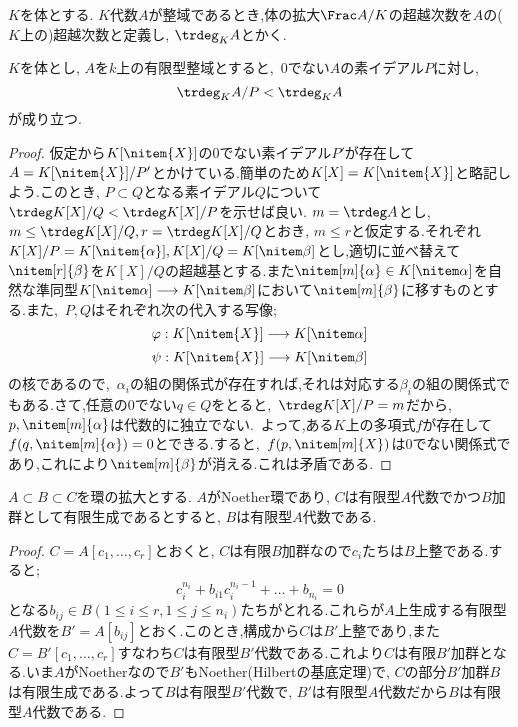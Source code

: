 \begin{defi}
	$K$を体とする. $K$代数$A$が整域であるとき,体の拡大$\Frac A/K$の超越次数を$A$の($K$上の)超越次数と定義し, $\trdeg_K A$とかく.
\end{defi}

\begin{prop}\label{prop:weeknullstellensatzの補題}
	$K$を体とし, $A$を$k$上の有限型整域とすると,~0でない$A$の素イデアル$P$に対し,
	\[\trdeg_K A/P<\trdeg_K A\]
	が成り立つ.
\end{prop}

\begin{proof}
	仮定から$K[\nitem{X}]$の0でない素イデアル$P'$が存在して$A=K[\nitem{X}]/P'$とかけている.簡単のため$K[X]=K[\nitem{X}]$と略記しよう.このとき, $P\subset Q$となる素イデアル$Q$について$\trdeg K[X]/Q<\trdeg K[X]/P$を示せば良い. $m=\trdeg A$とし,~$m\leq\trdeg K[X]/Q,r=\trdeg K[X]/Q$とおき, $m\leq r$と仮定する.それぞれ$K[X]/P=K[\nitem{\alpha}],K[X]/Q=K[\nitem\beta]$とし,適切に並べ替えて$\nitem[r]{\beta}$を$K[X]/Q$の超越基とする.また$\nitem[m]{\alpha}\in K[\nitem\alpha]$を自然な準同型$K[\nitem\alpha]\longrightarrow K[\nitem\beta]$において$\nitem[m]{\beta}$に移すものとする.また,~$P,Q$はそれぞれ次の代入する写像;
	\[\varphi:K[\nitem{X}]\longrightarrow K[\nitem\alpha]\]
	\[\psi:K[\nitem{X}]\longrightarrow K[\nitem\beta]\]
	の核であるので,~$\alpha_i$の組の関係式が存在すれば,それは対応する$\beta_i$の組の関係式でもある.さて,任意の$0$でない$q\in Q$をとると,~$\trdeg K[X]/P=m$だから,~$p,\nitem[m]{\alpha}$は代数的に独立でない.~よって,ある$K$上の多項式$f$が存在して$f(q,\nitem[m]{\alpha})=0$とできる.すると,~$f(p,\nitem[m]{X})$は0でない関係式であり,これにより$\nitem[m]{\beta}$が消える.これは矛盾である.
\end{proof}

\begin{lem}\label{lem:Artin-Tateの補題}
	$A\subset B\subset C$を環の拡大とする. $A$がNoether環であり, $C$は有限型$A$代数でかつ$B$加群として有限生成であるとすると, $B$は有限型$A$代数である.
\end{lem}

\begin{proof}
	$C=A[c_1,\dots,c_r]$とおくと, $C$は有限$B$加群なので$c_i$たちは$B$上整である.すると;
	\[c_i^{n_i}+b_{i1}c_i^{n_i-1}+\dots+b_{n_i}=0\]
	となる$b_{ij}\in B(1\leq i\leq r,1\leq j\leq n_i)$たちがとれる.これらが$A$上生成する有限型$A$代数を$B'=A[b_{ij}]$とおく.このとき,構成から$C$は$B'$上整であり,また$C=B'[c_1,\dots,c_r]$すなわち$C$は有限型$B'$代数である.これより$C$は有限$B'$加群となる.いま$A$がNoetherなので$B'$もNoether(Hilbertの基底定理)で, $C$の部分$B'$加群$B$は有限生成である.よって$B$は有限型$B'$代数で, $B'$は有限型$A$代数だから$B$は有限型$A$代数である. 
\end{proof}

